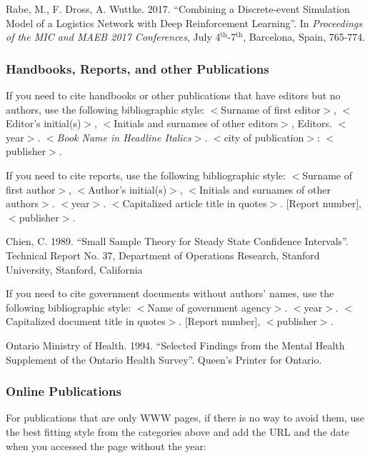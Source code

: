\documentclass{wscpaperproc}
\theoremstyle{wsc}
\begin{document}
{\footnotesize
\begin{hangref}
\item Rabe, M., F. Dross, A. Wuttke. 2017. ``Combining a Discrete-event Simulation Model of a Logistics Network with Deep Reinforcement Learning''. In \textit{Proceedings of the MIC and MAEB 2017 Conferences}, July 4$^{\textrm{th}}$-7$^{\textrm{th}}$, Barcelona, Spain, 765-774.
\end{hangref}
}

\subsubsection{Handbooks, Reports, and other Publications}
If you need to cite handbooks or other publications that have editors but no authors, use the following bibliographic style: 
$<$Surname of first editor$>$, $<$Editor’s initial(s)$>$, $<$Initials and surnames of other editors$>$, Editors. 
$<$year$>$. $<${\em Book Name in Headline Italics}$>$. $<$city of publication$>$: $<$publisher$>$.

If you need to cite reports, use the following bibliographic style: $<$Surname of first author$>$, $<$Author’s initial(s)$>$, $<$Initials and surnames of other authors$>$. $<$year$>$. $<$Capitalized article title in quotes$>$. $[$Report number$]$, $<$publisher$>$.

{\footnotesize
\begin{hangref}
\item Chien, C. 1989. ``Small Sample Theory for Steady State Confidence Intervals''. Technical Report No. 37, Department of Operations Research, Stanford University, Stanford, California
\end{hangref}
}

If you need to cite government documents without authors’ names, use the following bibliographic style: $<$Name of government agency$>$. $<$year$>$. $<$Capitalized document title in quotes$>$. $[$Report number$]$, $<$publisher$>$.

{\footnotesize
\begin{hangref}
\item Ontario Ministry of Health. 1994. ``Selected Findings from the Mental Health Supplement of the Ontario Health Survey''. Queen's Printer for Ontario.
\end{hangref}
}

\subsubsection{Online Publications}
For publications that are only WWW pages, if there is no way to avoid them, use the best fitting style from the categories above and add the URL and the date when you accessed the page without the year:
\end{document}
